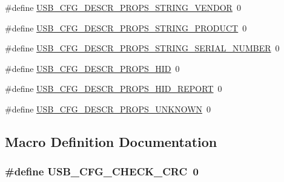 \begin{DoxyCompactItemize}
\item 
\#define \hyperlink{mhvlib-_vusb-_keyboard_2vusb_2usbconfig_8h_a55edf2117128387162339d98ba2af0f4}{U\-S\-B\-\_\-\-C\-F\-G\-\_\-\-D\-E\-S\-C\-R\-\_\-\-P\-R\-O\-P\-S\-\_\-\-S\-T\-R\-I\-N\-G\-\_\-\-V\-E\-N\-D\-O\-R}~0
\item 
\#define \hyperlink{mhvlib-_vusb-_keyboard_2vusb_2usbconfig_8h_aa08084f9755a643e02d469b66b129ef6}{U\-S\-B\-\_\-\-C\-F\-G\-\_\-\-D\-E\-S\-C\-R\-\_\-\-P\-R\-O\-P\-S\-\_\-\-S\-T\-R\-I\-N\-G\-\_\-\-P\-R\-O\-D\-U\-C\-T}~0
\item 
\#define \hyperlink{mhvlib-_vusb-_keyboard_2vusb_2usbconfig_8h_a82224c07d3a1f9fcccbff70b71c8ea51}{U\-S\-B\-\_\-\-C\-F\-G\-\_\-\-D\-E\-S\-C\-R\-\_\-\-P\-R\-O\-P\-S\-\_\-\-S\-T\-R\-I\-N\-G\-\_\-\-S\-E\-R\-I\-A\-L\-\_\-\-N\-U\-M\-B\-E\-R}~0
\item 
\#define \hyperlink{mhvlib-_vusb-_keyboard_2vusb_2usbconfig_8h_adfbd53b5310c36b1e4b06d6a3b992e8a}{U\-S\-B\-\_\-\-C\-F\-G\-\_\-\-D\-E\-S\-C\-R\-\_\-\-P\-R\-O\-P\-S\-\_\-\-H\-I\-D}~0
\item 
\#define \hyperlink{mhvlib-_vusb-_keyboard_2vusb_2usbconfig_8h_a248eae427d6cea0046661eb8438b7198}{U\-S\-B\-\_\-\-C\-F\-G\-\_\-\-D\-E\-S\-C\-R\-\_\-\-P\-R\-O\-P\-S\-\_\-\-H\-I\-D\-\_\-\-R\-E\-P\-O\-R\-T}~0
\item 
\#define \hyperlink{mhvlib-_vusb-_keyboard_2vusb_2usbconfig_8h_a3c9ed2d932cf0f5fc9788a91028a8b4b}{U\-S\-B\-\_\-\-C\-F\-G\-\_\-\-D\-E\-S\-C\-R\-\_\-\-P\-R\-O\-P\-S\-\_\-\-U\-N\-K\-N\-O\-W\-N}~0
\end{DoxyCompactItemize}


\subsection{Macro Definition Documentation}
\hypertarget{mhvlib-_vusb-_keyboard_2vusb_2usbconfig_8h_a57122aa75d9b598adcd238aee5f2b4b7}{
\subsubsection[{U\-S\-B\-\_\-\-C\-F\-G\-\_\-\-C\-H\-E\-C\-K\-\_\-\-C\-R\-C}]{\setlength{\rightskip}{0pt plus 5cm}\#define U\-S\-B\-\_\-\-C\-F\-G\-\_\-\-C\-H\-E\-C\-K\-\_\-\-C\-R\-C~0}}\label{mhvlib-_vusb-_keyboard_2vusb_2usbconfig_8h_a57122aa75d9b598adcd238aee5f2b4b7}


